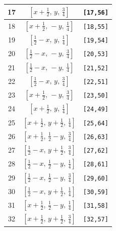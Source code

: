 \documentclass[fleqn,8pt]{jsarticle}
\begin{document}
\begin{longtable}{ccc}
17 & $\left[ x + \frac{1}{2},\, y,\, \frac{3}{4} \right]$ & {\tt [17,56]} \\ \hline
18 & $\left[ x + \frac{1}{2},\, - y,\, \frac{1}{4} \right]$ & {\tt [18,55]} \\ \hline
19 & $\left[ \frac{1}{2} - x,\, y,\, \frac{1}{4} \right]$ & {\tt [19,54]} \\ \hline
20 & $\left[ \frac{1}{2} - x,\, - y,\, \frac{3}{4} \right]$ & {\tt [20,53]} \\ \hline
21 & $\left[ \frac{1}{2} - x,\, - y,\, \frac{1}{4} \right]$ & {\tt [21,52]} \\ \hline
22 & $\left[ \frac{1}{2} - x,\, y,\, \frac{3}{4} \right]$ & {\tt [22,51]} \\ \hline
23 & $\left[ x + \frac{1}{2},\, - y,\, \frac{3}{4} \right]$ & {\tt [23,50]} \\ \hline
24 & $\left[ x + \frac{1}{2},\, y,\, \frac{1}{4} \right]$ & {\tt [24,49]} \\ \hline
25 & $\left[ x + \frac{1}{2},\, y + \frac{1}{2},\, \frac{1}{4} \right]$ & {\tt [25,64]} \\ \hline
26 & $\left[ x + \frac{1}{2},\, \frac{1}{2} - y,\, \frac{3}{4} \right]$ & {\tt [26,63]} \\ \hline
27 & $\left[ \frac{1}{2} - x,\, y + \frac{1}{2},\, \frac{3}{4} \right]$ & {\tt [27,62]} \\ \hline
28 & $\left[ \frac{1}{2} - x,\, \frac{1}{2} - y,\, \frac{1}{4} \right]$ & {\tt [28,61]} \\ \hline
29 & $\left[ \frac{1}{2} - x,\, \frac{1}{2} - y,\, \frac{3}{4} \right]$ & {\tt [29,60]} \\ \hline
30 & $\left[ \frac{1}{2} - x,\, y + \frac{1}{2},\, \frac{1}{4} \right]$ & {\tt [30,59]} \\ \hline
31 & $\left[ x + \frac{1}{2},\, \frac{1}{2} - y,\, \frac{1}{4} \right]$ & {\tt [31,58]} \\ \hline
32 & $\left[ x + \frac{1}{2},\, y + \frac{1}{2},\, \frac{3}{4} \right]$ & {\tt [32,57]} \\
\end{longtable}
\renewcommand{\arraystretch}{1.2}
\end{document}
